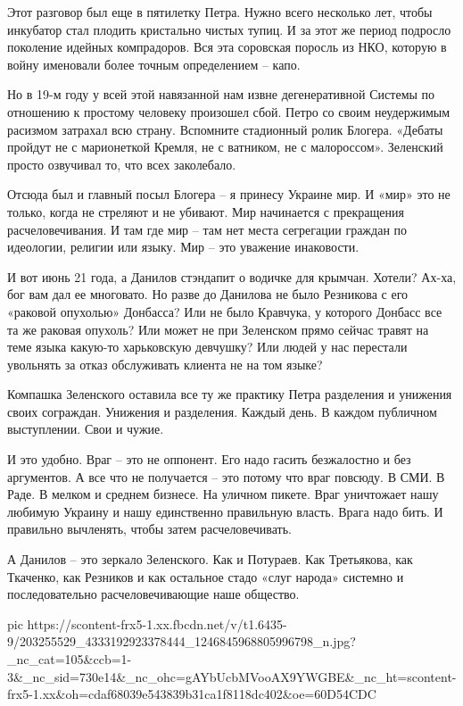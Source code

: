 Этот разговор был еще в пятилетку Петра. Нужно всего несколько лет, чтобы
инкубатор стал плодить кристально чистых тупиц. И за этот же период подросло
поколение идейных компрадоров. Вся эта соровская поросль из НКО, которую в
войну именовали более точным определением – капо.

Но в 19-м году у всей этой навязанной нам извне дегенеративной Системы по
отношению к простому человеку произошел сбой. Петро со своим неудержимым
расизмом затрахал всю страну. Вспомните стадионный ролик Блогера. «Дебаты
пройдут не с марионеткой Кремля, не с ватником, не с малороссом». Зеленский
просто озвучивал то, что всех заколебало.

Отсюда был и главный посыл Блогера – я принесу Украине мир. И «мир» это не
только, когда не стреляют и не убивают. Мир начинается с прекращения
расчеловечивания. И там где мир – там нет места сегрегации граждан по
идеологии, религии или языку. Мир – это уважение инаковости.

И вот июнь 21 года, а Данилов стэндапит о водичке для крымчан. Хотели? Ах-ха,
бог вам дал ее многовато. Но разве до Данилова не было Резникова с его «раковой
опухолью» Донбасса? Или не было Кравчука, у которого Донбасс все та же раковая
опухоль? Или может не при Зеленском прямо сейчас травят на теме языка какую-то
харьковскую девчушку? Или людей у нас перестали увольнять за отказ обслуживать
клиента не на том языке?

Компашка Зеленского оставила все ту же практику Петра разделения и унижения
своих сограждан. Унижения и разделения. Каждый день. В каждом публичном
выступлении. Свои и чужие.

И это удобно. Враг – это не оппонент. Его надо гасить безжалостно и без
аргументов. А все что не получается – это потому что враг повсюду. В СМИ. В
Раде. В мелком и среднем бизнесе. На уличном пикете. Враг уничтожает нашу
любимую Украину и нашу единственно правильную власть. Врага надо бить. И
правильно вычленять, чтобы затем расчеловечивать.

А Данилов – это зеркало Зеленского. Как и Потураев. Как Третьякова, как
Ткаченко, как Резников и как остальное стадо «слуг народа» системно и
последовательно расчеловечивающие наше общество.

\ifcmt
  pic https://scontent-frx5-1.xx.fbcdn.net/v/t1.6435-9/203255529_4333192923378444_1246845968805996798_n.jpg?_nc_cat=105&ccb=1-3&_nc_sid=730e14&_nc_ohc=gAYbUcbMVooAX9YWGBE&_nc_ht=scontent-frx5-1.xx&oh=cdaf68039e543839b31ca1f8118dc402&oe=60D54CDC
\fi

